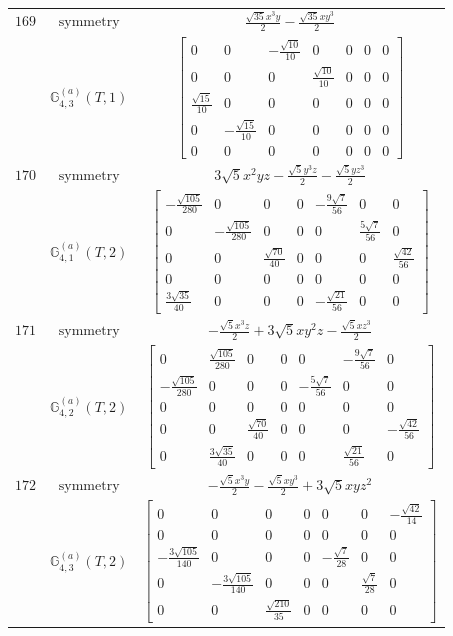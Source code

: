 \documentclass[fleqn,8pt,landscape]{jsarticle}
\begin{document}
\begin{longtable}{ccc}
$ 169 $ & $ \text{symmetry} $ & $ \frac{\sqrt{35} x^{3} y}{2} - \frac{\sqrt{35} x y^{3}}{2} $ \\
$  $ & $ \mathbb{G}_{4,3}^{(a)}(T,1) $ & $ \begin{bmatrix} 0 & 0 & - \frac{\sqrt{10}}{10} & 0 & 0 & 0 & 0 \\ 0 & 0 & 0 & \frac{\sqrt{10}}{10} & 0 & 0 & 0 \\ \frac{\sqrt{15}}{10} & 0 & 0 & 0 & 0 & 0 & 0 \\ 0 & - \frac{\sqrt{15}}{10} & 0 & 0 & 0 & 0 & 0 \\ 0 & 0 & 0 & 0 & 0 & 0 & 0 \end{bmatrix} $ \\ \hline
$ 170 $ & $ \text{symmetry} $ & $ 3 \sqrt{5} x^{2} y z - \frac{\sqrt{5} y^{3} z}{2} - \frac{\sqrt{5} y z^{3}}{2} $ \\
$  $ & $ \mathbb{G}_{4,1}^{(a)}(T,2) $ & $ \begin{bmatrix} - \frac{\sqrt{105}}{280} & 0 & 0 & 0 & - \frac{9 \sqrt{7}}{56} & 0 & 0 \\ 0 & - \frac{\sqrt{105}}{280} & 0 & 0 & 0 & \frac{5 \sqrt{7}}{56} & 0 \\ 0 & 0 & \frac{\sqrt{70}}{40} & 0 & 0 & 0 & \frac{\sqrt{42}}{56} \\ 0 & 0 & 0 & 0 & 0 & 0 & 0 \\ \frac{3 \sqrt{35}}{40} & 0 & 0 & 0 & - \frac{\sqrt{21}}{56} & 0 & 0 \end{bmatrix} $ \\ \hline
$ 171 $ & $ \text{symmetry} $ & $ - \frac{\sqrt{5} x^{3} z}{2} + 3 \sqrt{5} x y^{2} z - \frac{\sqrt{5} x z^{3}}{2} $ \\
$  $ & $ \mathbb{G}_{4,2}^{(a)}(T,2) $ & $ \begin{bmatrix} 0 & \frac{\sqrt{105}}{280} & 0 & 0 & 0 & - \frac{9 \sqrt{7}}{56} & 0 \\ - \frac{\sqrt{105}}{280} & 0 & 0 & 0 & - \frac{5 \sqrt{7}}{56} & 0 & 0 \\ 0 & 0 & 0 & 0 & 0 & 0 & 0 \\ 0 & 0 & \frac{\sqrt{70}}{40} & 0 & 0 & 0 & - \frac{\sqrt{42}}{56} \\ 0 & \frac{3 \sqrt{35}}{40} & 0 & 0 & 0 & \frac{\sqrt{21}}{56} & 0 \end{bmatrix} $ \\ \hline
$ 172 $ & $ \text{symmetry} $ & $ - \frac{\sqrt{5} x^{3} y}{2} - \frac{\sqrt{5} x y^{3}}{2} + 3 \sqrt{5} x y z^{2} $ \\
$  $ & $ \mathbb{G}_{4,3}^{(a)}(T,2) $ & $ \begin{bmatrix} 0 & 0 & 0 & 0 & 0 & 0 & - \frac{\sqrt{42}}{14} \\ 0 & 0 & 0 & 0 & 0 & 0 & 0 \\ - \frac{3 \sqrt{105}}{140} & 0 & 0 & 0 & - \frac{\sqrt{7}}{28} & 0 & 0 \\ 0 & - \frac{3 \sqrt{105}}{140} & 0 & 0 & 0 & \frac{\sqrt{7}}{28} & 0 \\ 0 & 0 & \frac{\sqrt{210}}{35} & 0 & 0 & 0 & 0 \end{bmatrix} $ \\ \hline

\end{longtable}
\end{document}
